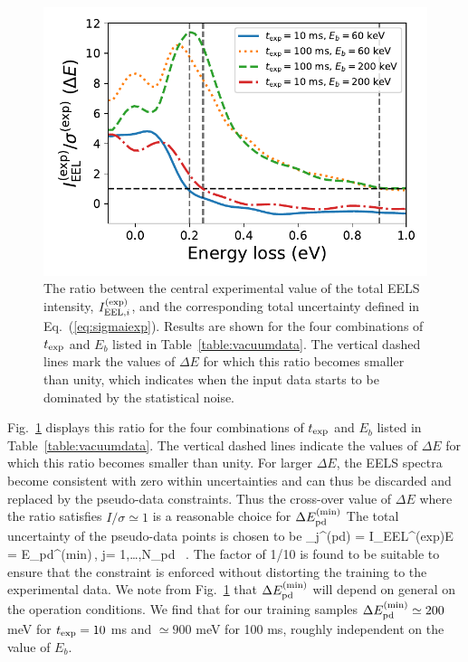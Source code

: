       
\begin{figure}[h]
    \centering
    \includegraphics[width=120mm]{plots/intensity_to_error_ratio.pdf}
    \caption{\small The ratio between the central experimental value of the total
      EELS intensity, $I_{{\rm EEL},i}^{(\rm exp)}$, and the corresponding
      total uncertainty defined in Eq.~(\ref{eq:sigmaiexp}).
      Results are shown for the four combinations of $t_{\rm exp}$
      and $E_{b}$ listed in Table~\ref{table:vacuumdata}.
      The vertical dashed lines mark the values of $\Delta E$ for which
      this ratio becomes smaller than unity, which indicates when the input
      data starts to be dominated by the statistical noise.
      }
    \label{fig:intensityratio}
\end{figure}

Fig.~\ref{fig:intensityratio} displays this ratio
for the four combinations of $t_{\rm exp}$
and $E_{b}$ listed in Table~\ref{table:vacuumdata}.
%
The vertical dashed lines indicate the values of $\Delta E$ for which
this ratio becomes smaller than unity.
%
For larger $\Delta E$, the EELS spectra become
consistent with zero within uncertainties and can thus be discarded and replaced
by the pseudo-data constraints.
%
Thus the cross-over value of $\Delta E$  where the ratio satisfies $I/\sigma\simeq 1$
is a reasonable choice for $\Delta E_{\rm pd}^{\rm (min)}$
%
The total uncertainty of the pseudo-data points is chosen to be
\be
\sigma_j^{(\rm pd)} = I_{{\rm EEL}}^{\rm (exp)}\lp \Delta E = \Delta E_{\rm pd}^{\rm (min)}\rp \,, \quad 
j= 1,\ldots,N_{\rm pd} \, .
\ee
The factor of 1/10 is found to be suitable to ensure that the constraint
is enforced without distorting
the training to the experimental data.
%
We note from Fig.~\ref{fig:intensityratio} that $\Delta E_{\rm pd}^{\rm (min)}$ will
depend on general on the operation conditions.
%
We find that
for our training samples $\Delta E_{\rm pd}^{\rm (min)} \simeq 200$ meV for $t_{\rm exp}=10$ ms
and $\simeq  900$ meV for 100 ms, roughly independent on the value of $E_b$.

